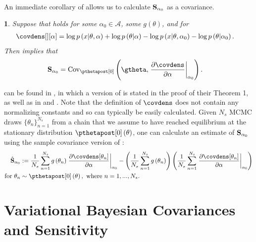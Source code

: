 \documentclass{article}\usepackage[]{graphicx}\usepackage[]{color}
\theoremstyle{definition}
\theoremstyle{plain}
\theoremstyle{plain}
\theoremstyle{plain}
\newtheorem{cor}{\protect\corollaryname}
\theoremstyle{definition}
\theoremstyle{plain}
\theoremstyle{plain}
\providecommand{\corollaryname}{Corollary}
\begin{document}
An immediate corollary of  allows us to calculate
$\mathbf{S}_{\alpha_{0}}$ as a  covariance.
\begin{cor}
\label{cor:sens_cov_prior}Suppose that 
holds for some $\alpha_{0}\in\mathcal{A}$, some $g\left(\theta\right)$, and for
\begin{align*}
\covdens[][\alpha] & =\log p\left(x\vert\theta,\alpha\right) +
    \log p\left(\theta\vert\alpha\right)-\log p\left(x\vert\theta,\alpha_{0}\right) -
    \log p\left(\theta\vert\alpha_{0}\right).
\end{align*}
Then  implies that
\begin{align}
\psens & =\pcov\left(\gtheta,\left.
    \frac{\partial\covdens}{\partial\alpha}\right|_{\alpha_{0}}\right).
    \label{eq:covariance_sensitivity}
\end{align}
\end{cor}
 can be found in \citet{basu:1996:local},
in which a version of  is stated in
the proof of their Theorem 1, as well as in \citet{perez:2006:mcmc}
and \citet{efron:2015:frequentist}. Note that the definition of $\covdens$
does not contain any normalizing constants and so can typically be
easily calculated. Given $N_s$ MCMC draws $\{\theta_n\}_{n=1}^{N_s}$ from a chain that we assume to have
reached equilibrium at the stationary distribution $\pzeropost\left(\theta\right)$,
one can calculate an estimate of $\mathbf{S}_{\alpha_{0}}$ using the sample covariance
version of :
\begin{align}
\psenshat & := \frac{1}{N_{s}}\sum_{n=1}^{N_{s}}
    g\left(\theta_{n}\right)\left.
    \frac{\partial\covdens[\theta_{n}]}{\partial\alpha}
    \right|_{\alpha_{0}}-\left(\frac{1}{N_{s}}
    \sum_{n=1}^{N_{s}}g\left(\theta_{n}\right)\right)
    \left(\frac{1}{N_{s}}\sum_{n=1}^{N_{s}}
    \left.\frac{\partial\covdens[\theta_{n}]}{\partial\alpha}
    \right|_{\alpha_{0}}\right)
\label{eq:mcmc_sample_cov}\\
\textrm{for }\theta_{n} &
    \sim\pzeropost\left(\theta\right),\textrm{ where }n=1,...,N_{s}.\nonumber
\end{align}
 

\section{Variational Bayesian Covariances and Sensitivity
\label{sec:vb_theory}}
\end{document}
